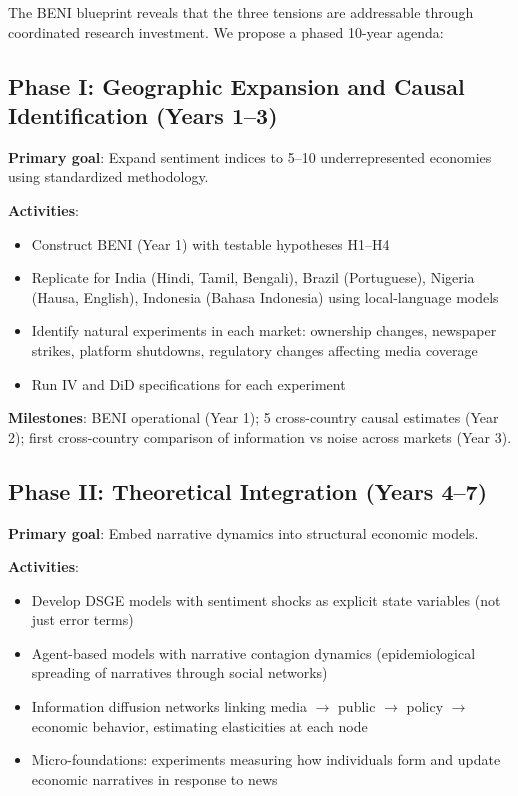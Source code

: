 \documentclass[11pt]{article}
\begin{document}
The BENI blueprint reveals that the three tensions are addressable through coordinated research investment. We propose a phased 10-year agenda:

\subsection*{Phase I: Geographic Expansion and Causal Identification (Years 1--3)}

\noindent\textbf{Primary goal}: Expand sentiment indices to 5--10 underrepresented economies using standardized methodology.

\noindent\textbf{Activities}:
\begin{itemize}
    \item Construct BENI (Year 1) with testable hypotheses H1--H4
    \item Replicate for India (Hindi, Tamil, Bengali), Brazil (Portuguese), Nigeria (Hausa, English), Indonesia (Bahasa Indonesia) using local-language models
    \item Identify natural experiments in each market: ownership changes, newspaper strikes, platform shutdowns, regulatory changes affecting media coverage
    \item Run IV and DiD specifications for each experiment
\end{itemize}

\noindent\textbf{Milestones}: BENI operational (Year 1); 5 cross-country causal estimates (Year 2); first cross-country comparison of information vs noise across markets (Year 3).

\subsection*{Phase II: Theoretical Integration (Years 4--7)}

\noindent\textbf{Primary goal}: Embed narrative dynamics into structural economic models.

\noindent\textbf{Activities}:
\begin{itemize}
    \item Develop DSGE models with sentiment shocks as explicit state variables (not just error terms)
    \item Agent-based models with narrative contagion dynamics (epidemiological spreading of narratives through social networks)
    \item Information diffusion networks linking media $\to$ public $\to$ policy $\to$ economic behavior, estimating elasticities at each node
    \item Micro-foundations: experiments measuring how individuals form and update economic narratives in response to news
\end{itemize}
\end{document}
